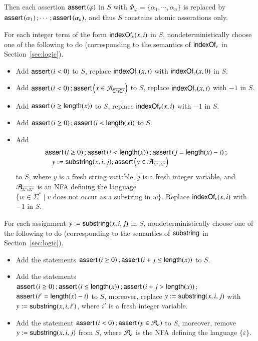 Then each assertion $\textsf{assert}\left(\varphi\right)$ in $S$ with $\Phi_\varphi = \{\alpha_1,\cdots,\alpha_n\}$ is replaced by $\textsf{assert}\left(\alpha_1\right); \cdots; \textsf{assert}\left(\alpha_n\right)$, and thus $S$ constains atomic asserations only. 

\medskip 
{}%

\smallskip

For each integer term of the form $\mathsf{indexOf}_v(x,i)$ in $S$, nondeterministically choose one of the following to do (corresponding to the semantics of $\mathsf{indexOf}_v$ in Section~\ref{sec:logic}).
\begin{itemize}
\item Add $\textsf{assert}\left(i < 0\right)$ to $S$, replace $\mathsf{indexOf}_v(x,i)$ with $\mathsf{indexOf}_v(x,0)$ in $S$. 
%
\item Add $\textsf{assert}\left(i < 0\right);\textsf{assert}\left(x \in \mathcal{A}_{\overline{\Sigma^*v\Sigma^*}}\right)$ to $S$, replace $\mathsf{indexOf}_v(x,i)$ with $-1$ in $S$.
%
\item Add $\textsf{assert}\left(i \ge \mathsf{length}(x)\right)$ to $S$, replace $\mathsf{indexOf}_v(x,i)$ with $-1$ in $S$.
%
\item Add $\textsf{assert}\left(i \ge 0\right); \textsf{assert}\left(i < \mathsf{length}(x)\right)$ to $S$.
%
\item Add 
%
$$
\begin{array}{l}
\textsf{assert}\left(i \ge 0\right); \textsf{assert}\left(i < \mathsf{length}(x)\right); \textsf{assert}\left(j=\mathsf{length}(x)-i\right); \\
\ \ \ \ y:=\mathsf{substring}(x, i, j); \textsf{assert}\left(y \in \mathcal{A}_{\overline{\Sigma^*v\Sigma^*}}\right)
\end{array}
$$ 
to $S$, where $y$ is a fresh string variable, $j$ is a fresh integer variable, and $\mathcal{A}_{\overline{\Sigma^*v\Sigma^*}}$ is an NFA defining the language $\{w \in \Sigma^*\mid v \mbox{ does not occur as a substring in } w\}$. Replace $\mathsf{indexOf}_v(x, i)$ with $-1$ in $S$.
\end{itemize}

%
For each assignment $y:=\mathsf{substring}(x, i, j)$ in $S$, nondeterministically choose one of the following to do (corresponding to the semantics of $\mathsf{substring}$ in Section~\ref{sec:logic}).
\begin{itemize}
\item Add the statements $\textsf{assert}\left(i \ge 0\right); \textsf{assert}\left(i + j \le \mathsf{length}(x)\right)$ to $S$. 
%
\item Add the statements 
$\textsf{assert}\left(i \ge 0\right); \textsf{assert}\left(i \le \mathsf{length}(x)\right);\textsf{assert}\left(i+j  > \mathsf{length}(x)\right)$; $\textsf{assert}\left(i'  = \mathsf{length}(x)-i\right)$
to $S$, moreover, replace $y:=\mathsf{substring}(x, i, j)$ with $y:=\mathsf{substring}(x, i, i')$, where $i'$ is a fresh integer variable.
%
\item Add the statement $\textsf{assert}\left(i < 0\right); \textsf{assert}\left(y \in \mathcal{A}_\varepsilon\right)$ to $S$, moreover, remove $y:=\mathsf{substring}(x, i, j)$ from $S$, where $\mathcal{A}_\varepsilon$ is the NFA defining the language $\{\varepsilon\}$.
\end{itemize}




